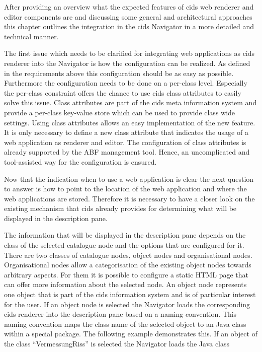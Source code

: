 After providing an overview what the expected features of cids web renderer and editor components are and discussing some general and architectural approaches this chapter outlines the integration in the cids Navigator in a more detailed and technical manner.

The first issue which needs to be clarified for integrating web applications as cids renderer into the Navigator is how the configuration can be realized.
As defined in the requirements above this configuration should be as easy as possible.
Furthermore the configuration needs to be done on a per-class level.
Especially the per-class constraint offers the chance to use cids class attributes to easily solve this issue.
Class attributes are part of the cids meta information system and provide a per-class key-value store which can be used to provide class wide settings.
Using class attributes allows an easy implementation of the new feature.
It is only necessary to define a new class attribute that indicates the usage of a web application as renderer and editor.
The configuration of class attributes is already supported by the ABF management tool.
Hence, an uncomplicated and tool-assisted way for the configuration is ensured.

Now that the indication when to use a web application is clear the next question to answer is how to point to the location of the web application and where the web applications are stored. Therefore it is necessary to have a closer look on the existing mechanism that cids already provides for determining what will be displayed in the description pane.

The information that will be displayed in the description pane depends on the class of the selected catalogue node and the options that are configured for it.
There are two classes of catalogue nodes, object nodes and organisational nodes. Organisational nodes allow a categorisation of the existing object nodes towards arbitrary aspects.
For them it is possible to configure a static HTML page that can offer more information about the selected node.
An object node represents one object that is part of the cids information system and is of particular interest for the user.
 If an object node is selected the Navigator loads the corresponding cids  renderer into the description pane based on a naming convention.
This naming convention maps the class name of the selected object to an Java class within a special package. 
The following example demonstrates this. If an object of the class \enquote{VermessungRiss} is selected the Navigator loads the Java class 

